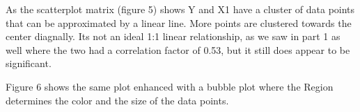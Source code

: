 \documentclass[12pt,letterpaper]{article}
\begin{document}
\begin{enumerate}
    As the scatterplot matrix (figure 5) shows Y and X1 have a cluster of data points that can be approximated by a linear line. More points are clustered towards the center diagnally. Its not an ideal 1:1 linear relationship, as we saw in part 1 as well where the two had a correlation factor of 0.53, but it still does appear to be significant. 

    Figure 6 shows the same plot enhanced with a bubble plot where the Region determines the color and the size of the data points. 
\end{enumerate}
\end{document}
